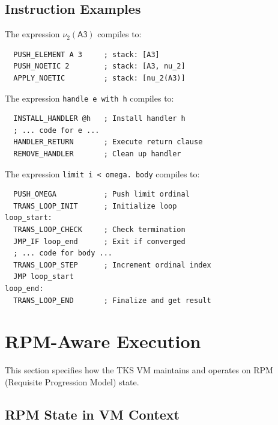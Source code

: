 \subsection{Instruction Examples}
\label{subsec:instruction-examples}

\begin{example}
\label{ex:bytecode-noetic}
The expression $\nu_2(\mathsf{A3})$ compiles to:
\begin{verbatim}
  PUSH_ELEMENT A 3     ; stack: [A3]
  PUSH_NOETIC 2        ; stack: [A3, nu_2]
  APPLY_NOETIC         ; stack: [nu_2(A3)]
\end{verbatim}
\end{example}

\begin{example}
\label{ex:bytecode-handler}
The expression \texttt{handle e with h} compiles to:
\begin{verbatim}
  INSTALL_HANDLER @h   ; Install handler h
  ; ... code for e ...
  HANDLER_RETURN       ; Execute return clause
  REMOVE_HANDLER       ; Clean up handler
\end{verbatim}
\end{example}

\begin{example}
\label{ex:bytecode-transfinite}
The expression \texttt{limit i < omega. body} compiles to:
\begin{verbatim}
  PUSH_OMEGA           ; Push limit ordinal
  TRANS_LOOP_INIT      ; Initialize loop
loop_start:
  TRANS_LOOP_CHECK     ; Check termination
  JMP_IF loop_end      ; Exit if converged
  ; ... code for body ...
  TRANS_LOOP_STEP      ; Increment ordinal index
  JMP loop_start
loop_end:
  TRANS_LOOP_END       ; Finalize and get result
\end{verbatim}
\end{example}

\section{RPM-Aware Execution}
\label{sec:rpm-aware-execution}

This section specifies how the TKS VM maintains and operates on RPM (Requisite Progression Model) state.

\subsection{RPM State in VM Context}
\label{subsec:rpm-state}


